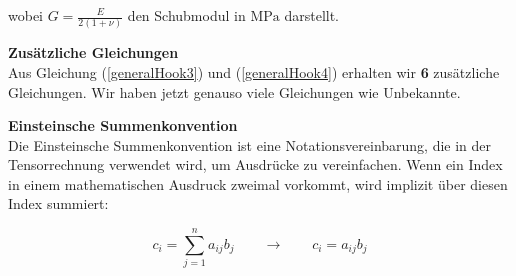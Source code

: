 wobei $G=\frac{E}{2(1+\nu)}$ den Schubmodul in $\text{MPa}$ darstellt.

\begin{framed}
\textbf{Zusätzliche Gleichungen}\\
Aus Gleichung (\ref{generalHook3}) und (\ref{generalHook4}) erhalten wir \textbf{6} zusätzliche Gleichungen. Wir haben jetzt genauso viele Gleichungen wie Unbekannte.
\end{framed}


\begin{framed}
\textbf{Einsteinsche Summenkonvention}\\
Die Einsteinsche Summenkonvention ist eine Notationsvereinbarung, die in der Tensorrechnung verwendet wird, um Ausdrücke zu vereinfachen. Wenn ein Index in einem mathematischen Ausdruck zweimal vorkommt, wird implizit über diesen Index summiert:

\begin{equation}
c_i = \sum_{j=1}^{n} a_{ij} b_j \qquad \rightarrow \qquad  c_i=a_{ij} b_j
\end{equation}
\end{framed}

